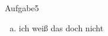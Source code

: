 \documentclass{article}
\begin{document}
  \raggedright Aufgabe5 \\
  \begin{enumerate}[a)]
    \item
        ich weiß das doch nicht
  \end{enumerate}
\end{document}
